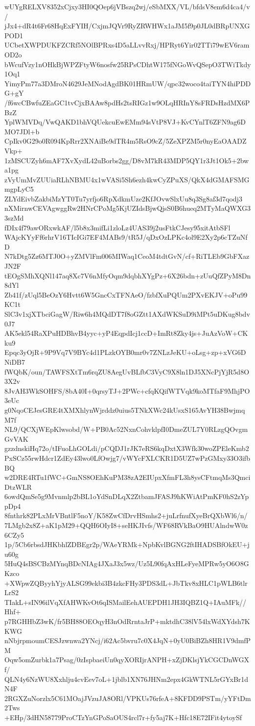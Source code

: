 wUYgRELXV8352xCjxy3HI0QOep6jVBszq2wj/eSbMXX/VL/bfdsV8em6d4ca4/v/
jJx4+dR4t6Fr68HqExFYIH/CxjmJQVr9RyZRWHWx1aJM5f9p0JL0dBRpUNXGPOD1
UCbetXWPDUKFZCRf5NOlBPRxs4D5aLLvvRxj/HPRyt6Yir02TTi79wEV6ramOD2o
bWcufVzy1nOHkBjWPZFtyW6nosfw25RPsCDhtW175fNGoWvQSepO3TWiTkdy1Oq1
YimyPm77a3DMroN4629JeMNodAgdBK01HRmUW/qpc32woco4taiTYN4hiPDDG+gY
/f6wcCBwfuZEaGC1tvCjxBAAw8pdHs2tsRIGz1w9OLqHRInY8sFRDsHzdMX6PBzZ
YplWMVDq/VwQAKD1bhVQUekcuEwEMm94sVtP8VJ+KvCYnlT6ZFN9ag6DMO7JDl+b
CpIkv0G29o0R094KpRrr2XNAiBe9dTR4m5RsO9cZ/5ZeXPZM5r0nyEaOAADZVkp+
1zMSCUZyh6mAF7XvXydL42uBorbs2gg/D8vM7kR43MDP5QY1r3Jt1Ok5+2bwa1pg
zVyUmMvZUUiaRLhNBMU4x1wVASi5Sh6ezh4kwCyZPuXS/QkX4dGMAFSMGmgpLyC5
ZLYdEivbZakbiMzYT0Tu7yrfjo6RpXdkmUze2KfJOvwSlxUu8q3Sg8af3d7qodj3
nXMirnwCEVAgwggRw2HNrCPoMg5KjUZIdsBjwQjsS0B6hueq2MTyMaQWXG33szMd
fDIx4f79awORxwkAF/l5b8x3mifLi1zloLz4UAS39j2usFtkCJesy95xitAtbSFl
WAjcKYyFf6rhrV16TIcIGi7EF4MABs9/tR5J/qDxOzLPKc4ol9E2Xy2p6cTZuNfD
N7kDtg5Zz6MTJ0O+yZMVlFm006MIWaq1CeoM4tdtGvN/cf+RiTLEb9GbFXazJN2F
tEOgSMhXQNl147aq8Xc7V6nMfyOqm9dqbhXYgPz+6X26bdn+zUuQfZPyM8Dn8dYl
Zb41f/zUql5BeOzY6Hvtt6W5GncCxTFNAeO/fzbfXuPQUm2PXvEKJV+oPu99KC1t
SlC3v1xjXTbciGagW/Riw6h4MQdDT7f8oGZtt1AXdWKSuD9iMPt5uDKug8bdv0J7
AK5ekl54RaXPuHDBhvB4yyc+yP4EqpdIcj1ccD+ImRt8Zky4js+JuAzVoW+CKku9
Epqc3yOjR+9P9Vq7V9BYc4d1PLzkOYB0mr0v7ZNLzJeKU+oLsg+zp+xVG6DNiDB7
fWQbK/oun/TAWFSXtTm6rqZU8AegUvBLfbC3VyC9X8ln1DJ5XNcPjYjR5d8O3X2v
8JvAH3WkSOHFS/8bA40I+0qrsyTJ+2PWc+cfqKQifWTVqk9koMTfaF9MhjPO3eUc
g0NqoCEJesGRE4tXMXhlynWjrddz0uius5TNkXWc24kUsxS165AvYH38BwjmqM7f
NL9/QCXjWEpKlwsobd/W+PB0Ac52NxnCohvklpfI0DmeZUL7Y0RLzgQOvgmGvVAK
gzzdnskiHq72o/tIFuoLhGOLdi/pCQDJ1rJK7eRS6kqDxtX3Wfk30woZPEleKmb2
PxSCz55rwHdcr1ZdEy43lwo0LfOwjg7/vWYcFXLCKR1D5UZ7wPzGMxy33O3ifbBQ
w2DRE4RTu1fWC+GmNS8OEhKuPM38zA2EIUpxXfmFL3h8ysCFtmqMs3QmciDtzWLR
6owdQmSe5g9Mvnmlp2bBL1oYdSnDLqX2ZtbamJFASJ9hKWiAtPmKF0hS2zYppDp4
8fnthrk82PLxMrVBntlF5noY/K58ZwCfDrvHSmhs2+juLrfnufXyeBrQXbWl6/n/
7LMgb2x8Z+aK1pM29+QQH6OIyI8+seHKJIvfs/WF68RVkBaO9HUAlndwW0z6CZy5
1p/5Cb6rbsdJHKbhlZDBEgr2p/WAeYRMk+NpbKvlBGNG2ftIHADSBfOkEU+ju60g
5HuQ4sBSCBzMYnqBDcNIAg4JXaJ3x5wz/Uz5L90fqAxHLeFyeMPRw5yO6O8GKzco
+XWpwZQByyhYjyALSG99ekbi3B4zkcFHy3PDS3dL+JbTkv8xHLC1pWLB6tlrLrS2
TIakL+sIN96ilVqXfAHWKvOt6qISMailEehAUEPDH1JH3IQBZ1Q+IAuMFk//Hhf+
p7RGHHbZ3wK/fr5BH88OEOqyH3nOdRrntaJrP+mktdhC38lV54lxWdXYdsh7KKWG
nNbjrpmoumCESJzwnwa2YNcj/i62Ac5bvru7c0X4JqN+0yU0BiBZh8HR1V9dmfPM
Oqw5omZurbk1a7Psag/0zIspbaeiUn0qyXORIjrANPH+xZjDKlsjYkCGCDnWGXf/
QLN4y6NzWU8Xxhlju4cvEev7oL+1jblb1XN76JHNm2epx4GkWTNL5rGYxBr1dN4F
2RGXZuNorzlx5C61MOajJVzuJA8ORl/VPKUs76rfeA+8KFDD9PSTm/yYFtDm2Tws
+EHp/3dHN58779ProCTzYnGPoSaOUS4rcl7r+fy5aj7K+Hfc18E72IFit4ytoySf
